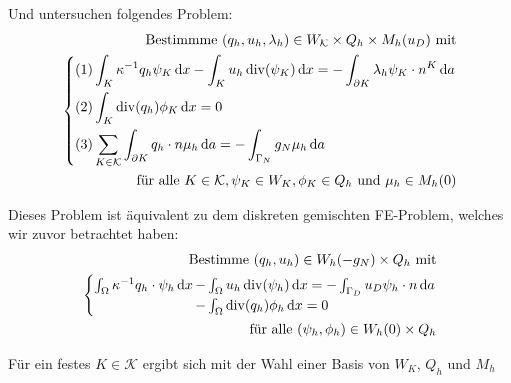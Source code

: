 Und untersuchen folgendes Problem:
\begin{align*}
\text{Bestimmme } (q_h,u_h, \lambda_h) \in W_\mathcal{K} \times Q_h \times M_h(u_D) \text{ mit}\\
\begin{dcases}
(1) \int_K \kappa^{-1} q_h \psi_K \, \mathrm{d} x - \int_K u_h \operatorname{div}(\psi_K) \, \mathrm{d} x = - \int_{\partial K} \lambda_h \psi_K \cdot n^K \, \mathrm{d} a \\
(2) \int_K \operatorname{div}(q_h) \phi_K \, \mathrm{d} x = 0\\
(3) \sum_{K\in \mathcal{K}} \int_{\partial K} q_h \cdot n \mu_h \, \mathrm{d} a = - \int_{\Gamma_N} g_N \mu_h \, \mathrm{d} a
\end{dcases}\\
\text{für alle } K \in \mathcal{K}, \psi_K \in W_K, \phi_K \in Q_h  \text{ und } \mu_h \in M_h(0)
\end{align*}

Dieses Problem ist äquivalent zu dem diskreten gemischten FE-Problem, welches wir zuvor betrachtet haben:
\begin{align*}
\text{Bestimme } (q_h,u_h) \in W_h(-g_N) \times Q_h \text{ mit}\\
\begin{cases}
\int_{\Omega} \kappa ^{-1} q_h \cdot \psi_h \, \mathrm{d} x \mkern-15mu &- \int_{\Omega} u_h \operatorname{div}(\psi_h) \, \mathrm{d} x = - \int_{\Gamma_D} u_D \psi_h \cdot n \, \mathrm{d} a\\
&- \int_{\Omega} \operatorname{div}(q_h) \phi_h \, \mathrm{d} x = 0
\end{cases} \\
\text{für alle } (\psi_h, \phi_h) \in W_h(0) \times Q_h
\end{align*}

Für ein festes $ K \in \mathcal{K} $ ergibt sich mit der Wahl einer Basis von $ W_K $, $ Q_h $ und $ M_h $ 

